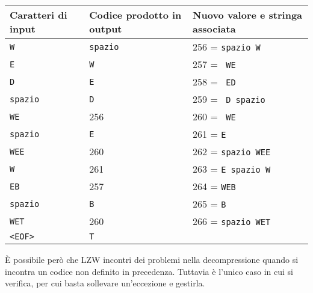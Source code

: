 \begin{table}
\centering
\begin{tabular}{lll} 
\hline
\textbf{Caratteri di input} & \textbf{Codice prodotto in output} & Nuovo valore e stringa associata  \\ 
\hline
\texttt{W}                           & \texttt{spazio}                             & 256 = \texttt{spazio W}                    \\
\texttt{E}                           & \texttt{W}                                  & 257 =~ \texttt{WE}                         \\
\texttt{D}                           & \texttt{E}                                  & 258 =~ \texttt{ED}                         \\
\texttt{spazio}                      & \texttt{D}                                  & 259 =~ \texttt{D spazio}                   \\
\texttt{WE}                          & 256                                & 260 =~ \texttt{WE}                         \\
\texttt{spazio}                      & \texttt{E}                                  & 261 = \texttt{E}                           \\
\texttt{WEE}                         & 260                                & 262 = \texttt{spazio WEE}                  \\
\texttt{W}                           & 261                                & 263 = \texttt{E spazio W}                  \\
\texttt{EB}                          & 257                                & 264 = \texttt{WEB}                         \\
\texttt{spazio}                      & \texttt{B}                                  & 265 = \texttt{B}                           \\
\texttt{WET}                         & 260                                & 266 = \texttt{spazio WET}                  \\
\texttt{<EOF>}                       & \texttt{T}                                  &                                  
\end{tabular}
\end{table}

\FloatBarrier

È possibile però che LZW incontri dei problemi nella decompressione quando si incontra un codice non definito in precedenza. Tuttavia è l'unico caso in cui si verifica, per cui basta sollevare un'eccezione e gestirla. 




\let\cleardoublepage\clearpage